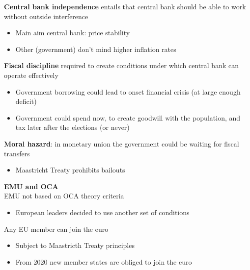 \documentclass{beamer}
\begin{document}
\begin{frame}
  \textbf{Central bank independence} entails that central bank should be able to work without outside interference
  \begin{itemize}
    \item Main aim central bank: price stability
    \item Other (government) don't mind higher inflation rates 
  \end{itemize}  
\end{frame}

\begin{frame}
  \textbf{Fiscal discipline} required to create conditions under which central bank can operate effectively
  \begin{itemize}
    \item Government borrowing could lead to onset financial crisis (at large enough deficit)
    \item Government could spend now, to create goodwill with the population, and tax later after the elections (or never)  
  \end{itemize}
  \medskip
   \textbf{Moral hazard}: in monetary union the government could be waiting for fiscal transfers
   \begin{itemize}
     \item Maastricht Treaty prohibits bailouts 
   \end{itemize}    
\end{frame}


\begin{frame} 
  \textbf{EMU and OCA}\\
  \medskip
  EMU not based on OCA theory criteria  
  \begin{itemize}
    \item European leaders decided to use another set of conditions
  \end{itemize}
  \medskip
  Any EU member can join the euro
\begin{itemize}
  \item Subject to Maastricth Treaty principles
  \item From 2020 new member states are obliged to join the euro
\end{itemize}
\end{frame}
\end{document}
